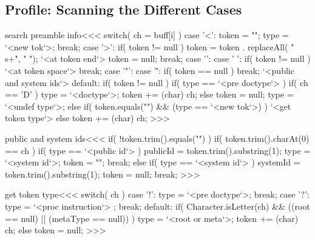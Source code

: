 \documentclass{article}
\begin{document}
\subsection{Profile: Scanning the Different Cases}




\<search preamble info\><<<
switch( ch = buff[i] ){
   case  '<':  token = "";
               type = `<new tok`>;
               break;
   case  '>':  if( token != null ){
                  token = token . replaceAll( "\\s+", " ");
                  `<at token end`>
                  token = null;
               }
               break;
   case '\n':
   case  ' ':  if( token != null ){
                  `<at token space`>
               }
               break;
   case  '"':
   case '\'':  if( token == null ){ break; }
               `<public and system ids`>
   default:    if( token != null ){
                  if( type == `<pre doctype`> ){
                     if( ch == 'D' ){
                        type = `<doctype`>;
                        token += (char) ch;
                     } else { token = null; type = `<undef type`>; }
                  }
                  else
                  if( token.equals("") && (type == `<new tok`>) ){
                     `<get token type`>
                  } else { token += (char) ch; }
}              }
>>>


\<public and system ids\><<<
if( !token.trim().equals("") ){
   if( token.trim().charAt(0) == ch ){
     if( type == `<public id`> ){
        publicId = token.trim().substring(1);
        type = `<system id`>;
        token = "";
        break;
     }
     else if( type == `<system id`> ){
        systemId = token.trim().substring(1);
        token = null;
        break;
     }
} }
>>>


\<get token type\><<<
switch( ch ){
   case '!': type = `<pre doctype`>;
             break;
   case '?': type = `<proc instruction`> ;
             break;
   default:  if( Character.isLetter(ch)
                 && ((root == null) || (metaType == null)) ){
                type = `<root or meta`>;
                token += (char) ch;
             } else { token = null; }
}
>>>
\end{document}
